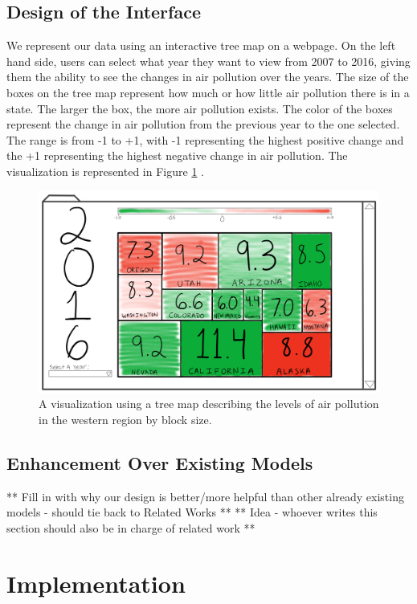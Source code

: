 \documentclass[journal]{vgtc}                %
\begin{document}
\subsection{Design of the Interface}

We represent our data using an interactive tree map on a webpage. On the left hand side, users can select what year 
they want to view from 2007 to 2016, giving them the ability to see the changes in air pollution over the years. The 
size of the boxes on the tree map represent how much or how little air pollution there is in a state. The larger the 
box, the more air pollution exists. The color of the boxes represent the change in air pollution from the previous 
year to the one selected. The range is from -1 to +1, with -1 representing the highest positive change and the +1 
representing the highest negative change in air pollution. The visualization is represented in Figure \ref{fig:Design}
.

\begin{figure}
\centering
\includegraphics[width=\columnwidth]{HW1Design}
\caption{A visualization using a tree map describing the levels of air pollution in the western region by block size.}
\label{fig:Design}
\end{figure}

\subsection{Enhancement Over Existing Models}

** Fill in with why our design is better/more helpful than other already existing models - should tie back to Related Works **
** Idea - whoever writes this section should also be in charge of related work **

\section{Implementation}
\end{document}
